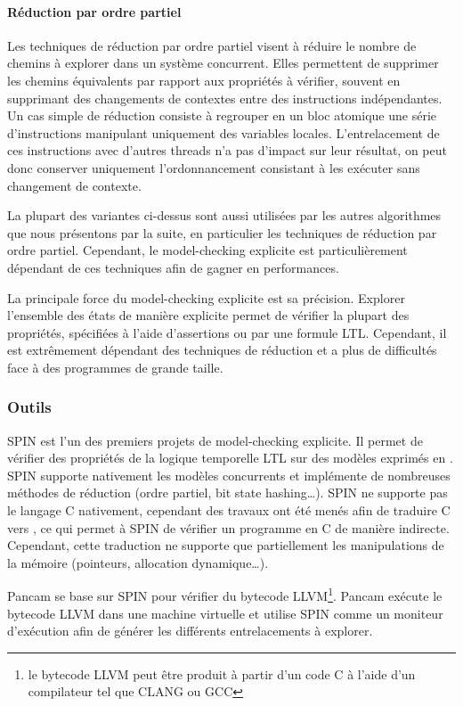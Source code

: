 \paragraph{Réduction par ordre partiel}
Les techniques de réduction par ordre partiel visent à réduire le nombre de
chemins à explorer dans un système concurrent. Elles permettent de supprimer les
chemins équivalents par rapport aux propriétés à vérifier, souvent en supprimant
des changements de contextes entre des instructions indépendantes. Un cas simple
de réduction consiste à regrouper en un bloc atomique une série d'instructions
manipulant uniquement des variables locales. L'entrelacement de ces instructions
avec d'autres threads n'a pas d'impact sur leur résultat, on peut donc conserver
uniquement l'ordonnancement consistant à les exécuter sans changement de
contexte.

La plupart des variantes ci-dessus sont aussi utilisées par les autres
algorithmes que nous présentons par la suite, en particulier les
techniques de réduction par ordre partiel. Cependant, le model-checking
explicite est particulièrement dépendant de ces techniques afin de
gagner en performances.

La principale force du model-checking explicite est sa précision. Explorer
l'ensemble des états de manière explicite permet de vérifier la plupart des
propriétés, spécifiées à l'aide d'assertions ou par une formule \ac{LTL}. Cependant,
il est extrêmement dépendant des techniques de réduction et a plus de
difficultés face à des programmes de grande taille.

\subsubsection{Outils}

SPIN\cite{SPIN} est l'un des premiers projets de model-checking
explicite. Il permet de vérifier des propriétés de la logique temporelle
\ac{LTL} sur des modèles exprimés en . SPIN supporte nativement
les modèles concurrents et implémente de nombreuses méthodes de réduction
(ordre partiel, bit state hashing\dots). SPIN ne supporte pas le langage
C nativement, cependant des travaux ont été menés afin de traduire C
vers \cite{jiang_C_to_Promela}, ce qui permet à SPIN de
vérifier un programme en C de manière indirecte. Cependant, cette traduction
ne supporte que partiellement les manipulations de la mémoire (pointeurs,
allocation dynamique\dots).

Pancam\cite{Pancam} se base sur SPIN pour vérifier du bytecode
LLVM\footnote{le bytecode LLVM peut être produit à partir d'un code C à
l'aide d'un compilateur tel que CLANG ou GCC}. Pancam exécute le
bytecode LLVM dans une machine virtuelle et utilise SPIN comme un
moniteur d'exécution afin de générer les différents entrelacements à
explorer.

